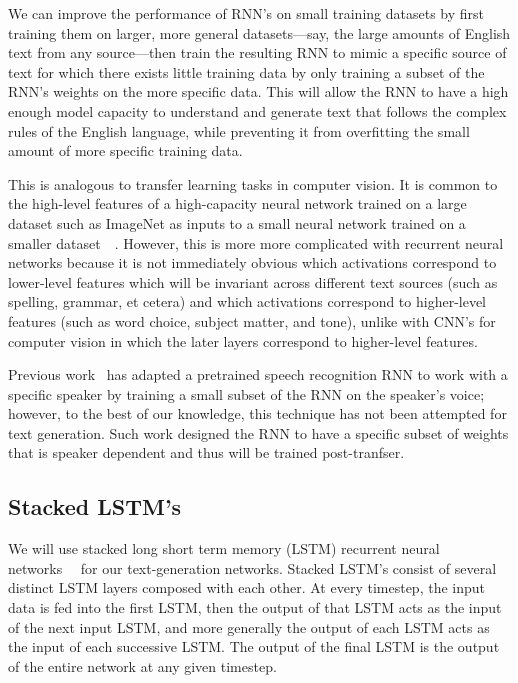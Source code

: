 \documentclass[10pt,twocolumn,letterpaper]{article}
\begin{document}
	We can improve the performance of RNN's on small training datasets by first training them on larger, more general datasets---say, the large amounts of English text from any source---then train the resulting RNN to mimic a specific source of text for which there exists little training data by only training a subset of the RNN's weights on the more specific data. This will allow the RNN to have a high enough model capacity to understand and generate text that follows the complex rules of the English language, while preventing it from overfitting the small amount of more specific training data.
	
	This is analogous to transfer learning tasks in computer vision. It is common to the high-level features of a high-capacity neural network trained on a large dataset such as ImageNet as inputs to a small neural network trained on a smaller dataset~\cite{CNNOffTheShelf}~\cite{TransferableFeaturesNN}. However, this is more more complicated with recurrent neural networks because it is not immediately obvious which activations correspond to lower-level features which will be invariant across different text sources (such as spelling, grammar, et cetera) and which activations correspond to higher-level features (such as word choice, subject matter, and tone), unlike with CNN's for computer vision in which the later layers correspond to higher-level features.
	
	Previous work~\cite{SpeakerAdaptation} has adapted a pretrained speech recognition RNN to work with a specific speaker by training a small subset of the RNN on the speaker's voice; however, to the best of our knowledge, this technique has not been attempted for text generation. Such work designed the RNN to have a specific subset of weights that is speaker dependent and thus will be trained post-tranfser.
	
	\subsection{Stacked LSTM's}
		We will use stacked long short term memory (LSTM) recurrent neural networks~\cite{LSTM}~\cite{graves2013generating} for our text-generation networks. Stacked LSTM's consist of several distinct LSTM layers composed with each other. At every timestep, the input data is fed into the first LSTM, then the output of that LSTM acts as the input of the next input LSTM, and more generally the output of each LSTM acts as the input of each successive LSTM. The output of the final LSTM is the output of the entire network at any given timestep.
		
\end{document}
